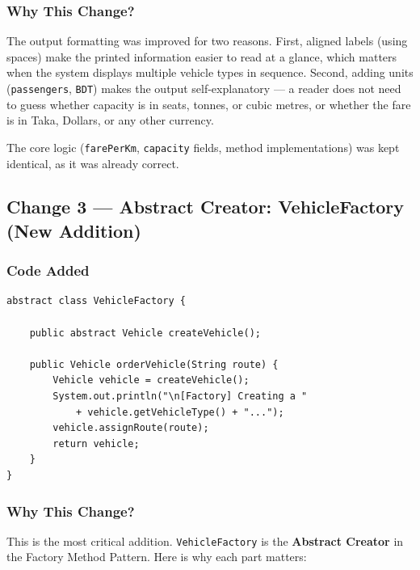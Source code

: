 \documentclass[12pt, a4paper]{article}
\begin{document}
\subsubsection{Why This Change?}

The output formatting was improved for two reasons. First, aligned labels (using spaces) make the printed information easier to read at a glance, which matters when the system displays multiple vehicle types in sequence. Second, adding units (\texttt{passengers}, \texttt{BDT}) makes the output self-explanatory --- a reader does not need to guess whether capacity is in seats, tonnes, or cubic metres, or whether the fare is in Taka, Dollars, or any other currency.

The core logic (\texttt{farePerKm}, \texttt{capacity} fields, method implementations) was kept identical, as it was already correct.

\subsection{Change 3 --- Abstract Creator: VehicleFactory (New Addition)}

\subsubsection{Code Added}

\begin{lstlisting}[caption={Abstract VehicleFactory --- the heart of the pattern}]
abstract class VehicleFactory {

    public abstract Vehicle createVehicle();

    public Vehicle orderVehicle(String route) {
        Vehicle vehicle = createVehicle();
        System.out.println("\n[Factory] Creating a "
            + vehicle.getVehicleType() + "...");
        vehicle.assignRoute(route);
        return vehicle;
    }
}
\end{lstlisting}

\subsubsection{Why This Change?}

This is the most critical addition. \texttt{VehicleFactory} is the \textbf{Abstract Creator} in the Factory Method Pattern. Here is why each part matters:
\end{document}
